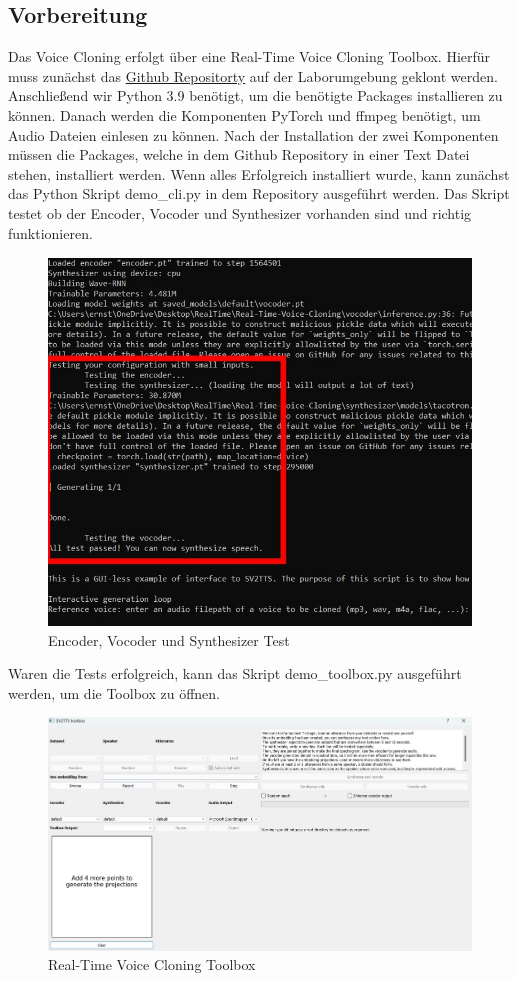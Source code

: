 \subsection{Vorbereitung}
Das Voice Cloning erfolgt über eine Real-Time Voice Cloning Toolbox. Hierfür muss zunächst das \href{https://github.com/CorentinJ/Real-Time-Voice-Cloning}{Github Repositorty} auf der Laborumgebung geklont werden. Anschließend wir Python 3.9 benötigt, um die benötigte Packages installieren zu können. Danach werden die Komponenten PyTorch und ffmpeg benötigt, um Audio Dateien einlesen zu können. Nach der Installation der zwei Komponenten müssen die Packages, welche in dem Github Repository in einer Text Datei stehen, installiert werden. Wenn alles Erfolgreich installiert wurde, kann zunächst das Python Skript demo\_cli.py in dem Repository ausgeführt werden. Das Skript testet ob der Encoder, Vocoder und Synthesizer vorhanden sind und richtig funktionieren.
\begin{figure}[H]
    \includegraphics[width=1.0\textwidth]{Bilder/ToolboxTest}
    \centering
    \caption{Encoder, Vocoder und Synthesizer Test}
    \label{fig:KomponentenTest}
\end{figure}
Waren die Tests erfolgreich, kann das Skript demo\_toolbox.py ausgeführt werden, um die Toolbox zu öffnen.
\begin{figure}[H]
    \includegraphics[width=1.0\textwidth]{Bilder/AudioToolbox1}
    \centering
    \caption{Real-Time Voice Cloning Toolbox}
    \label{fig:RTVCloningToolbox}
\end{figure}
